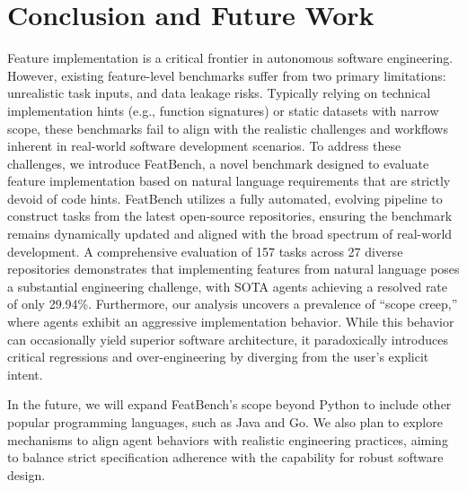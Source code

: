 \section{Conclusion and Future Work}
Feature implementation is a critical frontier in autonomous software engineering. However, existing feature-level benchmarks suffer from two primary limitations: unrealistic task inputs, and data leakage risks. Typically relying on technical implementation hints (e.g., function signatures) or static datasets with narrow scope, these benchmarks fail to align with the realistic challenges and workflows inherent in real-world software development scenarios.
To address these challenges, we introduce FeatBench, a novel benchmark designed to evaluate feature implementation based on natural language requirements that are strictly devoid of code hints. FeatBench utilizes a fully automated, evolving pipeline to construct tasks from the latest open-source repositories, ensuring the benchmark remains dynamically updated and aligned with the broad spectrum of real-world development.
A comprehensive evaluation of 157 tasks across 27 diverse repositories demonstrates that implementing features from natural language poses a substantial engineering challenge, with SOTA agents achieving a resolved rate of only 29.94\%. Furthermore, our analysis uncovers a prevalence of ``scope creep,'' where agents exhibit an aggressive implementation behavior. While this behavior can occasionally yield superior software architecture, it paradoxically introduces critical regressions and over-engineering by diverging from the user's explicit intent.

In the future, we will expand FeatBench's scope beyond Python to include other popular programming languages, such as Java and Go. We also plan to explore mechanisms to align agent behaviors with realistic engineering practices, aiming to balance strict specification adherence with the capability for robust software design.